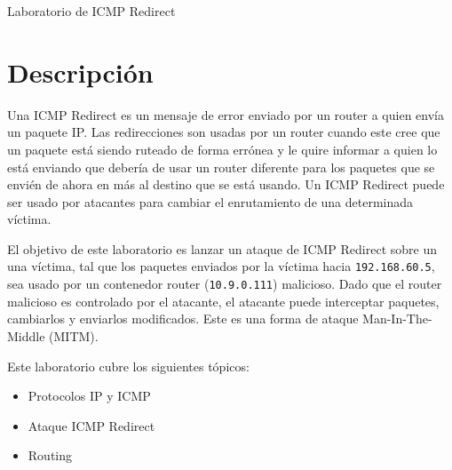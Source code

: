 
\newcommand{\commonfolder}{../../common-files}




\newcommand{\ipFigs}{./Figs}






\begin{center}
{\LARGE Laboratorio de ICMP Redirect}
\end{center}



\section{Descripción}

Una ICMP Redirect es un mensaje de error enviado por un router a quien envía un paquete IP. Las redirecciones son usadas por un router cuando este cree que un paquete está siendo ruteado de forma errónea y le quire informar a quien lo está enviando que debería de usar un router diferente para los paquetes que se envién de ahora en más al destino que se está usando. Un ICMP Redirect puede ser usado por atacantes para cambiar el enrutamiento de una determinada víctima.

El objetivo de este laboratorio es lanzar un ataque de ICMP Redirect sobre un una víctima, tal que los paquetes enviados por la víctima hacia \texttt{192.168.60.5}, sea usado por un contenedor router (\texttt{10.9.0.111}) malicioso.
Dado que el router malicioso es controlado por el atacante, el atacante puede interceptar paquetes, cambiarlos y enviarlos modificados. Este es una forma de ataque Man-In-The-Middle (MITM).

Este laboratorio cubre los siguientes tópicos:


\begin{itemize}[noitemsep]
\item Protocolos IP y ICMP
\item Ataque ICMP Redirect
\item Routing 
\end{itemize}


